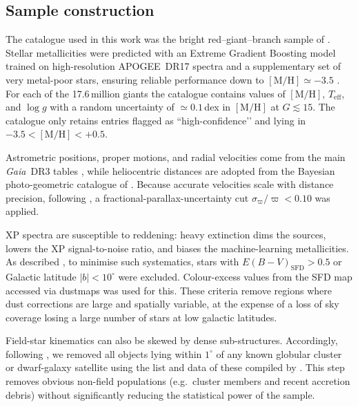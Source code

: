 \documentclass[a4paper,12pt]{article}
\begin{document}
\subsection{Sample construction}
\label{subsec:datasample}

The catalogue used in this work was the bright red–giant–branch sample of \citet{Andrae2023}.  
Stellar metallicities were predicted with an Extreme Gradient Boosting model 
trained on high-resolution \textsc{APOGEE}~DR17 spectra and a supplementary 
set of very metal-poor stars, ensuring reliable performance down to 
$[\mathrm{M/H}]\simeq-3.5$ \citep{Andrae2023}.  
For each of the 17.6\,million giants the catalogue contains values of 
$[\mathrm{M/H}]$, $T_{\mathrm{eff}}$, and $\log g$ with a random uncertainty 
of $\simeq0.1$\,dex in $[\mathrm{M/H}]$ at $G\!\lesssim\!15$.  
The catalogue only retains entries flagged as “high-confidence’’ and lying 
in $-3.5<[\mathrm{M/H}]<+0.5$.

Astrometric positions, proper motions, and radial velocities come from the main 
\textit{Gaia}~DR3 tables \citep{GaiaCollaboration2023}, while heliocentric 
distances are adopted from the Bayesian photo-geometric catalogue of 
\citet{BailerJones2021}.  
Because accurate velocities scale with distance precision, following \citet{zhang2024existencemetalpoordiscmilky},
a fractional-parallax-uncertainty cut $\sigma_{\varpi}/\varpi<0.10$ 
was applied.

XP spectra are susceptible to reddening: heavy extinction dims the sources, 
lowers the XP signal-to-noise ratio, and biases the machine-learning metallicities.  
As described \citet{zhang2024existencemetalpoordiscmilky}, to minimise 
such systematics, stars with $E(B{-}V)_{\mathrm{SFD}}>0.5$ or Galactic latitude 
$|b|<10^{\circ}$ were excluded. Colour-excess values from the SFD map accessed 
via dustmaps \citep{Green2018} was used for this.  
These criteria remove regions where dust corrections are large and spatially 
variable, at the expense of a loss of sky coverage losing a large number of stars 
at low galactic latitudes.

Field-star kinematics can also be skewed by dense sub-structures.  
Accordingly, following \citet{zhang2024existencemetalpoordiscmilky}, we removed 
all objects lying within $1^{\circ}$ of any known globular cluster or 
dwarf-galaxy satellite using the list and data of these compiled by 
\citet{Pace2024}.  
This step removes obvious non-field populations (e.g.\ cluster members and 
recent accretion debris) without significantly reducing the statistical power 
of the sample.
\end{document}

